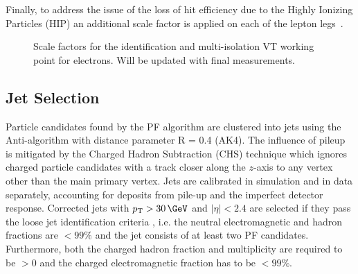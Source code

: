       Finally, to address the issue of the loss of hit efficiency due to the Highly Ionizing Particles (HIP) an additional scale factor is applied on each of the lepton legs~\cite{twiki:HIP}.

      \begin{figure}
	\centering
	\caption{Scale factors for the identification and multi-isolation VT working point for electrons. Will be updated with final measurements.}
	\label{fig:SF_e}
      \end{figure}

  \subsection{Jet Selection}
  Particle candidates found by the PF algorithm are clustered into jets using the Anti-\kt algorithm \citep{Cacciari:2008gp} with distance parameter R = 0.4 (AK4). The influence of pileup
  is mitigated by the Charged Hadron Subtraction (CHS) technique which ignores charged particle candidates with a track closer along the $z$-axis to any vertex other than the main primary vertex. 
  Jets are calibrated in simulation and in data separately, accounting for deposits from pile-up and the imperfect detector response.
  Corrected jets with $p_{\mathrm{T}}> 30\,\GeV$ and $|\eta|<2.4$ are selected if they pass the loose jet identification criteria \citep{twiki:jetId}, i.e. the neutral electromagnetic and hadron fractions
  are $<99\%$ and the jet consists of at least two PF candidates. Furthermore, both the charged hadron fraction and multiplicity are required to be $>0$ and the charged electromagnetic fraction has to be $<99\%$.

